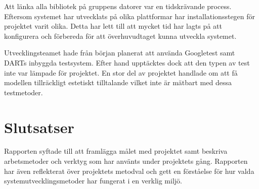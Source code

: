 \documentclass[a4paper,12pt,oneside,final]{extbook}
\begin{document}
Att länka alla bibliotek på gruppens datorer var en tidskrävande process. Eftersom systemet har utvecklats på olika plattformar har installationsstegen för projektet varit olika. Detta har lett till att mycket tid har lagts på att konfigurera och förbereda för att överhuvudtaget kunna utveckla systemet.

Utvecklingsteamet hade från början planerat att använda Googletest samt DARTs inbyggda testsystem. Efter hand upptäcktes dock att den typen av test inte var lämpade för projektet. En stor del av projektet handlade om att få modellen tillräckligt estetiskt tilltalande vilket inte är mätbart med dessa testmetoder.

\chapter{Slutsatser}
Rapporten syftade till att framlägga målet med projektet samt beskriva arbetsmetoder och verktyg som har använts under projektets gång. Rapporten har även reflekterat över projektets metodval och gett en förståelse för hur valda systemutvecklingsmetoder har fungerat i en verklig miljö.
\end{document}
